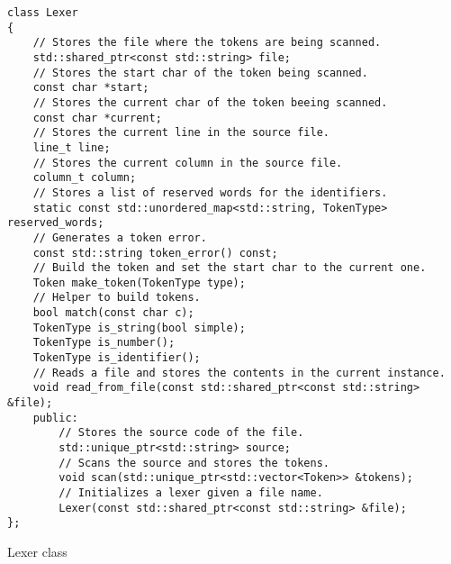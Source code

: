 \begin{listing}[H]
\begin{verbatim}
class Lexer
{
    // Stores the file where the tokens are being scanned.
    std::shared_ptr<const std::string> file;
    // Stores the start char of the token being scanned.
    const char *start;
    // Stores the current char of the token beeing scanned.
    const char *current;
    // Stores the current line in the source file.
    line_t line;
    // Stores the current column in the source file.
    column_t column;
    // Stores a list of reserved words for the identifiers.
    static const std::unordered_map<std::string, TokenType> reserved_words;
    // Generates a token error.
    const std::string token_error() const;
    // Build the token and set the start char to the current one.
    Token make_token(TokenType type);
    // Helper to build tokens.
    bool match(const char c);
    TokenType is_string(bool simple);
    TokenType is_number();
    TokenType is_identifier();
    // Reads a file and stores the contents in the current instance.
    void read_from_file(const std::shared_ptr<const std::string> &file);
    public:
        // Stores the source code of the file.
        std::unique_ptr<std::string> source;
        // Scans the source and stores the tokens.
        void scan(std::unique_ptr<std::vector<Token>> &tokens);
        // Initializes a lexer given a file name.
        Lexer(const std::shared_ptr<const std::string> &file);
};
\end{verbatim}
\caption{Lexer class}
\label{ls:lexer_class}
\end{listing}
